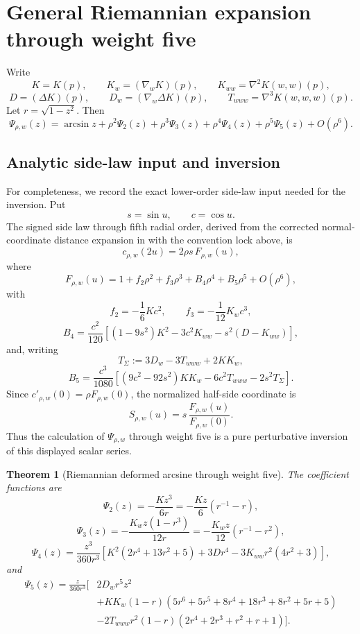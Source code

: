 \documentclass[11pt]{article}
\newtheorem{theorem}{Theorem}[section]
\theoremstyle{definition}
\theoremstyle{remark}
\begin{document}
\section{General Riemannian expansion through weight five}
\label{sec:weight-five}

Write
\[
K=K(p),\qquad
K_w=(\nabla_wK)(p),\qquad
K_{ww}=\nabla^2K(w,w)(p),
\]
\[
D=(\Delta K)(p),\qquad
D_w=(\nabla_w\Delta K)(p),\qquad
T_{www}=\nabla^3K(w,w,w)(p).
\]
Let \(r=\sqrt{1-z^2}\).  Then
\[
\Psi_{\rho,w}(z)
=
\arcsin z
+\rho^2\Psi_2(z)
+\rho^3\Psi_3(z)
+\rho^4\Psi_4(z)
+\rho^5\Psi_5(z)
+O(\rho^6).
\]

\subsection{Analytic side-law input and inversion}

For completeness, we record the exact lower-order side-law input needed for
the inversion.  Put
\[
s=\sin u,\qquad c=\cos u.
\]
The signed side law through fifth radial order, derived from the corrected
normal-coordinate distance expansion in \cite{Brewin2009} with the convention
lock above, is \cite{BakerCurvature}
\[
c_{\rho,w}(2u)
=2\rho s\,F_{\rho,w}(u),
\]
where
\[
F_{\rho,w}(u)
=1+f_2\rho^2+f_3\rho^3+B_4\rho^4+B_5\rho^5+O(\rho^6),
\]
with
\[
f_2=-\frac16Kc^2,
\qquad
f_3=-\frac1{12}K_wc^3,
\]
\[
B_4
=\frac{c^2}{120}
\left[(1-9s^2)K^2-3c^2K_{ww}-s^2(D-K_{ww})\right],
\]
and, writing
\[
T_\Sigma:=3D_w-3T_{www}+2KK_w,
\]
\[
B_5
=\frac{c^3}{1080}
\left[(9c^2-92s^2)KK_w-6c^2T_{www}-2s^2T_\Sigma\right].
\]
Since \(c'_{\rho,w}(0)=\rho F_{\rho,w}(0)\), the normalized
half-side coordinate is
\[
\boxed{
S_{\rho,w}(u)
=s\,\frac{F_{\rho,w}(u)}{F_{\rho,w}(0)}.
}
\]
Thus the calculation of \(\Psi_{\rho,w}\) through weight five is a
pure perturbative inversion of this displayed scalar series.

\begin{theorem}[Riemannian deformed arcsine through weight five]
\label{thm:psi-five}
The coefficient functions are
\[
\boxed{
\Psi_2(z)
=-\frac{Kz^3}{6r}
=-\frac{Kz}{6}(r^{-1}-r),
}
\]
\[
\boxed{
\Psi_3(z)
=-\frac{K_wz(1-r^3)}{12r}
=-\frac{K_wz}{12}(r^{-1}-r^2),
}
\]
\[
\boxed{
\Psi_4(z)
=
\frac{z^3}{360r^3}
\left[
K^2(2r^4+13r^2+5)
+3Dr^4
-3K_{ww}r^2(4r^2+3)
\right],
}
\]
and
\[
\boxed{
\begin{aligned}
\Psi_5(z)
=
\frac{z}{360r^3}\Big[
&2D_wr^5z^2
\\
&+KK_w(1-r)
(5r^6+5r^5+8r^4+18r^3+8r^2+5r+5)
\\
&-2T_{www}r^2(1-r)
(2r^4+2r^3+r^2+r+1)
\Big].
\end{aligned}}
\]
\end{theorem}
\end{document}
